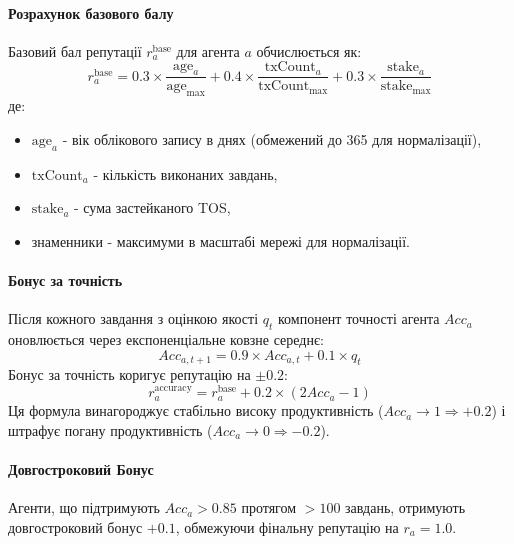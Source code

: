 \documentclass[11pt]{article}
\begin{document}
\paragraph{Розрахунок базового балу} Базовий бал репутації $r_a^{\text{base}}$ для агента $a$ обчислюється як:
\begin{equation}
r_a^{\text{base}} = 0.3 \times \frac{\text{age}_a}{\text{age}_{\max}} + 0.4 \times \frac{\text{txCount}_a}{\text{txCount}_{\max}} + 0.3 \times \frac{\text{stake}_a}{\text{stake}_{\max}}
\end{equation}
де:
\begin{itemize}[noitemsep]
  \item $\text{age}_a$ - вік облікового запису в днях (обмежений до 365 для нормалізації),
  \item $\text{txCount}_a$ - кількість виконаних завдань,
  \item $\text{stake}_a$ - сума застейканого TOS,
  \item знаменники - максимуми в масштабі мережі для нормалізації.
\end{itemize}

\paragraph{Бонус за точність} Після кожного завдання з оцінкою якості $q_t$ компонент точності агента $Acc_a$ оновлюється через експоненціальне ковзне середнє:
\begin{equation}
Acc_{a,t+1} = 0.9 \times Acc_{a,t} + 0.1 \times q_t
\end{equation}
Бонус за точність коригує репутацію на $\pm 0.2$:
\begin{equation}
r_a^{\text{accuracy}} = r_a^{\text{base}} + 0.2 \times (2 Acc_a - 1)
\end{equation}
Ця формула винагороджує стабільно високу продуктивність ($Acc_a \to 1 \Rightarrow +0.2$) і штрафує погану продуктивність ($Acc_a \to 0 \Rightarrow -0.2$).

\paragraph{Довгостроковий Бонус} Агенти, що підтримують $Acc_a > 0.85$ протягом $>100$ завдань, отримують довгостроковий бонус $+0.1$, обмежуючи фінальну репутацію на $r_a = 1.0$.
\end{document}
